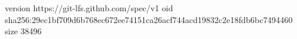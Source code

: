version https://git-lfs.github.com/spec/v1
oid sha256:29ec1bf709d6b768ec672ee74151ca26acf744acd19832c2e18fdb6bc7494460
size 38496

